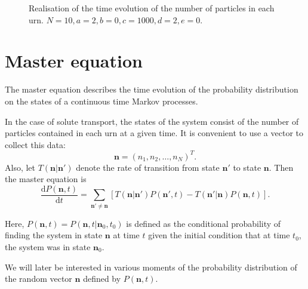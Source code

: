 \documentclass[a4paper,11pt]{report}
\numberwithin{equation}{section}
\newcommand{\diff}[2]{\frac{\mathrm{d} #1}{\mathrm{d} #2}}
\newcommand{\V}[1]{\mathbf{#1}}
\begin{document}
\begin{figure}[ht!]
    \centering
    {
    }

    \caption{\label{fig:exreal2}Realisation of the time evolution of the number
of particles in each urn. \(N=10,a=2,b=0,c=1000,d=2,e=0\).}
\end{figure}

\FloatBarrier

\section{Master equation}
The master equation describes the time evolution of the probability distribution
on the states of a continuous time Markov processes.

%

In the case of solute transport, the states of the system consist of the number
of particles contained in each urn at a given time. It is convenient to use a
vector to collect this data:
\begin{equation}
    \label{eqn:state_vector}
    \V{n} = \left(n_1,n_2, \dotsc, n_N\right)^{T}.
\end{equation}
Also, let \(T(\V{n}|\V{n}')\) denote the rate of transition from state \(\V{n}'\)
to state \(\V{n}\). Then the master equation is \citep{mckane2012stochastic}
\begin{equation}
    \label{eqn:master_eqn_rates}
    \diff{P(\V{n},t)}{t} = \sum_{\V{n}' \neq \V{n}} \left[ T(\V{n}|\V{n}')
        P(\V{n}',t) - T(\V{n}'|\V{n}) P(\V{n},t) \right].
\end{equation}

Here, \(P(\V{n},t) = P(\V{n},t | \V{n}_0, t_0)\) is defined as the conditional probability of finding the
system in state \(\V{n}\) at time \(t\) given the initial condition that at time
\(t_0\), the system was in state \(\V{n}_0\).

We will later be interested in various moments of the probability distribution
of the random vector \(\V{n}\) defined by \(P(\V{n},t)\).
\end{document}
